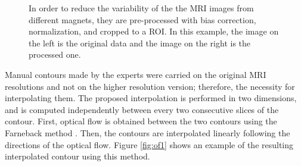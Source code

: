 \begin{figure}[h]
    \caption{In order to reduce the variability of the the MRI images from different
    magnets, they are pre-processed with bias correction, normalization, and cropped to a ROI.
    In this example, the image on the left is the original data and the image on the right
    is the processed one. }
    \label{fig:roi}
\end{figure}

Manual contours made by the experts were carried on the original MRI
resolutions and not on the higher resolution version; therefore, 
the necessity for interpolating them. 
The proposed interpolation is performed in two dimensions, and
is computed independently between every two consecutive slices of the contour. 
First, optical flow is obtained between the two contours using the  
Farneback method \cite{optflow}. Then, the contours are interpolated linearly following
the directions of the optical flow. Figure \ref{fig:of1} shows an
example of the resulting interpolated contour using this method. 

